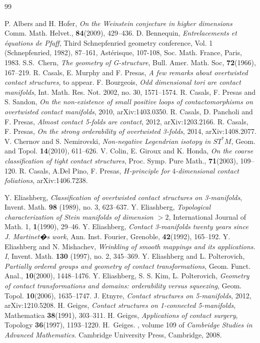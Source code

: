 \documentclass[12pt]{paper}
\theoremstyle{plain}
\theoremstyle{definition}
\numberwithin{figure}{section}
\begin{document}
\begin{thebibliography}{99}

  P. Albers and H. Hofer, {\em On the Weinstein conjecture in higher dimensions} 	Comm. Math. Helvet., {\bf  84}(2009),  429--436.
 D. Bennequin, {\em Entrelacements et \'equations de Pfaff}, Third Schnepfenried geometry conference, Vol. 1 (Schnepfenried, 1982), 87--161, Ast\'erisque, 107-108, Soc. Math. France, Paris, 1983. 
 S.S.~Chern, {\em The geometry of G-structure}, Bull. Amer. Math. Soc, {\bf 72}(1966),  167--219.
 R. Casals, E. Murphy
and F. Presas,
{\em A few remarks about overtwisted contact structures}, to appear.
 F. Bourgeois, {\em  Odd dimensional tori are contact manifolds}, Int. Math. Res. Not. 2002, no. 30, 1571--1574. 
 R. Casals, F. Presas and S. Sandon, {\em On the non-existence of small positive loops of contactomorphisms on overtwisted contact manifolds},  2010, arXiv:1403.0350.
 R. Casals, D. Pancholi and F. Presas, {\em  Almost contact 5-folds are contact}, 2012, arXiv:1203.2166. 
 R. Casals, F. Presas, {\em On the strong orderability of overtwisted 3-folds}, 2014, arXiv:1408.2077.
 V. Chernov and S. Nemirovski, {\em Non-negative Legendrian isotopy in $ST^*M$},  Geom. and Topol. {\bf 14}(2010), 611--626.
 V. Colin, E. Giroux and K. Honda, {\em On the coarse classification of tight contact structures}, Proc. Symp. Pure Math., {\bf 71}(2003), 109--120.
 R. Casals, A.Del Pino, F. Presas, {\em $H$-principle for $4$-dimensional contact foliations}, arXiv:1406.7238.
 
 Y. Eliashberg, {\em  Classification of overtwisted contact structures on 3-manifolds}, Invent. Math. {\bf 98} (1989), no. 3, 623--637.
   Y. Eliashberg, {\em Topological characterization of Stein manifolds of dimension $>2$},  International Journal of
Math. 1,  {\bf 1}(1990), 29--46.
 Y. Eliashberg, {\em Contact 3-manifolds twenty years since J. Martinet�s work}, Ann. Inst. Fourier, Grenoble, {\bf 42}(1992),   165--192.
 Y. Eliashberg and N. Mishachev, {\em  Wrinkling of smooth mappings and its applications. I}, Invent. Math. {\bf 130} (1997), no. 2, 345--369.
 Y. Eliashberg and L. Polterovich, {\em Partially ordered groups and geometry of contact transformations}, Geom. Funct. Anal., {\bf 10}(2000), 1448--1476.
 Y. Eliashberg, S. S. Kim, L. Polterovich, {\em Geometry of contact transformations and domains: orderability versus squeezing},   Geom. Topol. {\bf 10}(2006),  1635--1747.  
 J. Etnyre, {\em  Contact structures on 5-manifolds}, 2012, arXiv:1210.5208.
 H. Geiges, {\em Contact structures on 1-connected 5-manifolds}, Mathematica {\bf 38}(1991), 303--311.
 H. Geiges, {\em Applications of contact surgery}, Topology {\bf 36}(1997), 1193--1220.
H.~Geiges.
, volume 109 of {\em
  Cambridge Studies in Advanced Mathematics}.
\newblock Cambridge University Press, Cambridge, 2008.



\end{thebibliography}
\end{document}
